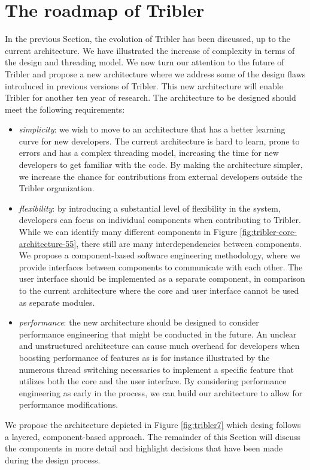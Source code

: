 \section{The roadmap of Tribler}
\label{sec:tribler-roadmap}
In the previous Section, the evolution of Tribler has been discussed, up to the current architecture. We have illustrated the increase of complexity in terms of the design and threading model. We now turn our attention to the future of Tribler and propose a new architecture where we address some of the design flaws introduced in previous versions of Tribler. This new architecture will enable Tribler for another ten year of research. The architecture to be designed should meet the following requirements:
\begin{itemize}
	\item \emph{simplicity}: we wish to move to an architecture that has a better learning curve for new developers. The current architecture is hard to learn, prone to errors and has a complex threading model, increasing the time for new developers to get familiar with the code. By making the architecture simpler, we increase the chance for contributions from external developers outside the Tribler organization.
	\item \emph{flexibility}: by introducing a substantial level of flexibility in the system, developers can focus on individual components when contributing to Tribler. While we can identify many different components in Figure \ref{fig:tribler-core-architecture-55}, there still are many interdependencies between components. We propose a component-based software engineering methodology, where we provide interfaces between components to communicate with each other. The user interface should be implemented as a separate component, in comparison to the current architecture where the core and user interface cannot be used as separate modules.
	\item \emph{performance}: the new architecture should be designed to consider performance engineering that might be conducted in the future. An unclear and unstructured architecture can cause much overhead for developers when boosting performance of features as is for instance illustrated by the numerous thread switching necessaries to implement a specific feature that utilizes both the core and the user interface. By considering performance engineering as early in the process, we can build our architecture to allow for performance modifications.
\end{itemize}
We propose the architecture depicted in Figure \ref{fig:tribler7} which desing follows a layered, component-based approach. The remainder of this Section will discuss the components in more detail and highlight decisions that have been made during the design process.

